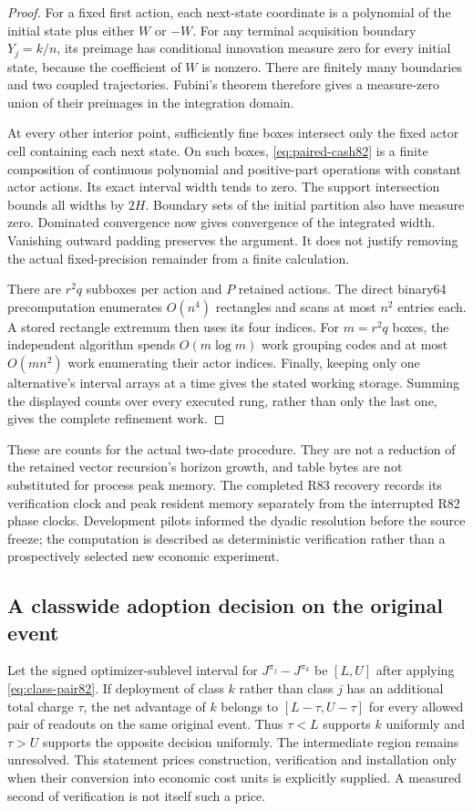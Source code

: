 \begin{proof}
For a fixed first action, each next-state coordinate is a polynomial of the initial state plus either $W$ or $-W$. For any terminal acquisition boundary $Y_j=k/n$, its preimage has conditional innovation measure zero for every initial state, because the coefficient of $W$ is nonzero. There are finitely many boundaries and two coupled trajectories. Fubini's theorem therefore gives a measure-zero union of their preimages in the integration domain.

At every other interior point, sufficiently fine boxes intersect only the fixed actor cell containing each next state. On such boxes, \eqref{eq:paired-cash82} is a finite composition of continuous polynomial and positive-part operations with constant actor actions. Its exact interval width tends to zero. The support intersection bounds all widths by $2H$. Boundary sets of the initial partition also have measure zero. Dominated convergence now gives convergence of the integrated width. Vanishing outward padding preserves the argument. It does not justify removing the actual fixed-precision remainder from a finite calculation.

There are $r^2q$ subboxes per action and $P$ retained actions. The direct binary64 precomputation enumerates $O(n^4)$ rectangles and scans at most $n^2$ entries each. A stored rectangle extremum then uses its four indices. For $m=r^2q$ boxes, the independent algorithm spends $O(m\log m)$ work grouping codes and at most $O(mn^2)$ work enumerating their actor indices. Finally, keeping only one alternative's interval arrays at a time gives the stated working storage. Summing the displayed counts over every executed rung, rather than only the last one, gives the complete refinement work.
\end{proof}

These are counts for the actual two-date procedure. They are not a reduction of the retained vector recursion's horizon growth, and table bytes are not substituted for process peak memory. The completed R83 recovery records its verification clock and peak resident memory separately from the interrupted R82 phase clocks. Development pilots informed the dyadic resolution before the source freeze; the computation is described as deterministic verification rather than a prospectively selected new economic experiment.

\subsection{A classwide adoption decision on the original event}
Let the signed optimizer-sublevel interval for $J^{\pi_j}-J^{\pi_k}$ be $[L,U]$ after applying \eqref{eq:class-pair82}. If deployment of class $k$ rather than class $j$ has an additional total charge $\tau$, the net advantage of $k$ belongs to $[L-\tau,U-\tau]$ for every allowed pair of readouts on the same original event. Thus $\tau<L$ supports $k$ uniformly and $\tau>U$ supports the opposite decision uniformly. The intermediate region remains unresolved. This statement prices construction, verification and installation only when their conversion into economic cost units is explicitly supplied. A measured second of verification is not itself such a price.

